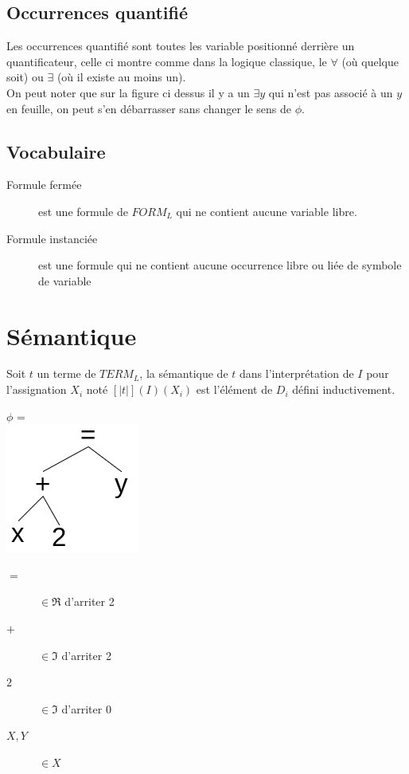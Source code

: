 \subsection{Occurrences quantifié}
Les occurrences quantifié sont toutes les variable positionné derrière un quantificateur, celle ci montre comme dans la logique classique, le $\forall$ (où quelque soit) ou $\exists$ (où il existe au moins un).\\
On peut noter que sur la figure ci dessus il y a un $\exists y$ qui n'est pas associé à un $y$ en feuille, on peut s'en débarrasser sans changer le sens de $\phi$.

\subsection{Vocabulaire}
\begin{description}
\item[Formule fermée] est une formule de $FORM_{L}$ qui ne contient aucune variable libre.
\item[Formule instanciée] est une formule qui ne contient aucune occurrence libre ou liée de symbole de variable
\end{description}

\pagebreak
\section{Sémantique}
Soit $t$ un terme de $TERM_L$, la sémantique de $t$ dans l'interprétation de $I$ pour l'assignation $X_i$ noté $[|t|](I)(X_i)$ est l'élément de $D_i$ défini inductivement.

\begin{center}
$\phi$ = \\
\includegraphics[scale=0.4]{img/of-fo-sem.png} 
\end{center}

\begin{description}
\item[$=$] $\in \Re$ d'arriter 2
\item[$+$] $\in \Im$ d'arriter 2
\item[$2$] $\in \Im$ d'arriter 0
\item[$X,Y$] $\in X$
\end{description}

